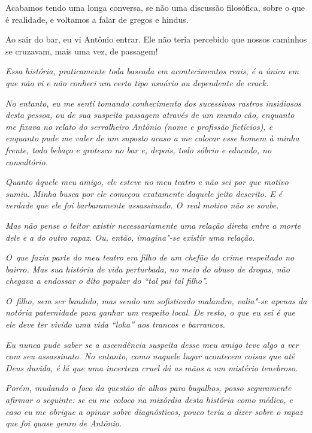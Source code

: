 Acabamos tendo uma longa conversa, se não uma discussão filosófica, sobre
o que é realidade, e voltamos a falar de gregos e hindus.

Ao sair do bar, eu vi Antônio entrar. Ele não teria percebido que nossos
caminhos se cruzavam, mais uma vez, de passagem!

\begin{center}\asterisc{}\end{center}
\begingroup\small

\emph{Essa história, praticamente toda baseada em acontecimentos reais, é a
única em que não vi e não conheci um certo tipo usuário ou dependente de
crack.}~

\emph{No entanto, eu me senti tomando conhecimento dos sucessivos
rastros insidiosos desta pessoa, ou de sua suspeita passagem através de
um mundo cão, enquanto me fixava no relato do serralheiro Antônio (nome
e profissão fictícios), e enquanto pude me valer de um suposto acaso a
me colocar esse homem à minha frente, todo bebaço e grotesco no bar e,
depois, todo sóbrio e educado, no consultório.}~

\emph{Quanto àquele meu amigo, ele esteve no meu teatro e não sei por
que motivo sumiu. Minha busca por ele começou exatamente daquele jeito
descrito. E é verdade que ele foi barbaramente assassinado. O~real
motivo não se soube.}~

\emph{Mas não pense o leitor existir necessariamente uma relação direta
entre a morte dele e a do outro rapaz. Ou, então, imagina"-se existir uma
relação.}~

\emph{O~que fazia parte do meu teatro era filho de um chefão do crime
respeitado no bairro. Mas sua história de vida perturbada, no meio do
abuso de drogas, não chegava a endossar o dito popular do ``tal pai tal
filho''.}~

\emph{O~filho, sem ser bandido, mas sendo um sofisticado malandro,
valia"-se apenas da notória paternidade para ganhar um respeito local. De
resto, o que eu sei é que ele deve ter vivido uma vida ``loka'' aos
trancos e barrancos.}~

\emph{Eu nunca pude saber se a ascendência suspeita desse meu amigo teve
algo a ver com seu assassinato. No entanto, como naquele lugar acontecem
coisas que até Deus duvida, é lá que uma incerteza cruel dá as mãos a um
mistério tenebroso.}~

\emph{Porém, mudando o foco da questão de alhos para bugalhos, posso
seguramente afirmar o seguinte: se eu me coloco na mixórdia desta
história como médico, e caso eu me obrigue a opinar sobre diagnósticos,
pouco teria a dizer sobre o rapaz que foi quase genro de Antônio.}~

